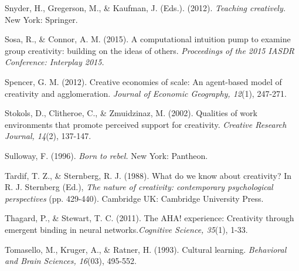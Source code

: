 \documentclass[a4paper,12pt,man,british]{apa6}
\begin{document}
\begin{description}
\item Snyder, H., Gregerson, M., \& Kaufman, J. (Eds.). (2012). \emph{Teaching creatively.} New York: Springer. 

\item Sosa, R., \& Connor, A. M. (2015). A computational intuition pump to examine group creativity: building on the ideas of others. \emph{Proceedings of the 2015 IASDR Conference: Interplay 2015.}

\item Spencer, G. M. (2012). Creative economies of scale: An agent-based model of creativity and agglomeration. \emph{Journal of Economic Geography, 12}(1), 247-271.%


\item Stokols, D., Clitheroe, C., \& Zmuidzinaz, M. (2002). Qualities of work environments that promote perceived support for creativity. \emph{Creative Research Journal, 14}(2), 137-147.

\item Sulloway, F. (1996). \emph{Born to rebel.} New York: Pantheon.


\item Tardif, T. Z., \& Sternberg, R. J. (1988). What do we know about creativity? In R. J. Sternberg (Ed.), \emph{The nature of creativity: contemporary psychological perspectives} (pp. 429-440). Cambridge UK: Cambridge University Press.

\item Thagard, P., \& Stewart, T. C. (2011). The AHA! experience: Creativity through emergent binding in neural networks.\emph{Cognitive Science, 35}(1), 1-33. 


\item Tomasello, M., Kruger, A., \& Ratner, H. (1993). Cultural learning. \emph{Behavioral and Brain Sciences, 16}(03), 495-552. 


\end{description}
\end{document}
